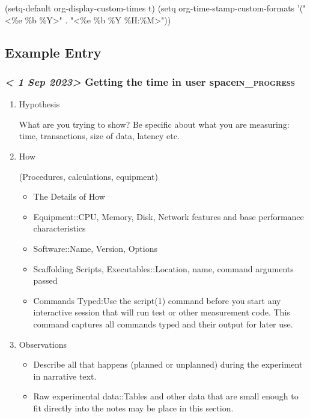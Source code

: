 \documentclass[11pt]{article}
\begin{document}
(setq-default org-display-custom-times t)
(setq org-time-stamp-custom-formats '("<\%e \%b \%Y>" . "<\%e \%b \%Y \%H:\%M>"))

\subsection{Example Entry}
\label{sec:org5f202f1}

\subsubsection{\textit{< 1 Sep 2023>} Getting the time in user space\hfill{}\textsc{in\_progress}}
\label{sec:org8eaef4c}

\begin{enumerate}
\item Hypothesis
\label{sec:org9e36f4d}

What are you trying to show?  Be specific about what you are
measuring: time, transactions, size of data, latency etc.

\item How
\label{sec:org7e122f8}

(Procedures, calculations, equipment)

\begin{itemize}
\item The Details of How

\item Equipment::CPU, Memory, Disk, Network features and base performance
characteristics

\item Software::Name, Version, Options

\item Scaffolding Scripts, Executables::Location, name, command arguments
passed

\item Commands Typed:Use the script(1) command before you start any
interactive session that will run test or other measurement code.
This command captures all commands typed and their output for later
use.
\end{itemize}

\item Observations
\label{sec:orgc0bebb0}

\begin{itemize}
\item Describe all that happens (planned or unplanned) during the
experiment in narrative text.

\item Raw experimental data::Tables and other data that are small enough
to fit directly into the notes may be place in this section.


\end{itemize}
\end{enumerate}
\end{document}
